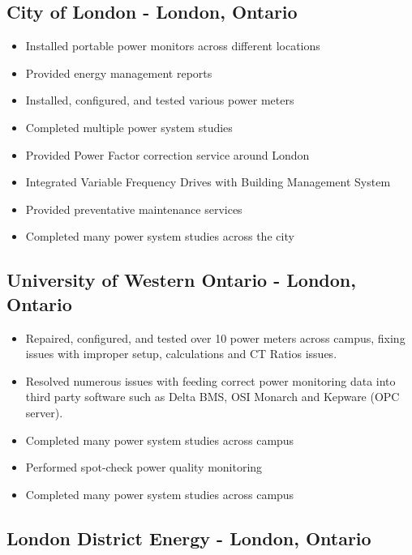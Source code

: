 \pagebreak

\subsection{City of London - London, Ontario}
\label{PreExp:CoL}

\begin{itemize}
	\item Installed portable power monitors across different locations
	\item Provided energy management reports
	\item Installed, configured, and tested various power meters
	\item Completed multiple power system studies
	\item Provided Power Factor correction service around London
	\item Integrated Variable Frequency Drives with Building Management System
	\item Provided preventative maintenance services
	\item Completed many power system studies across the city
\end{itemize}

\pagebreak

\subsection{University of Western Ontario - London, Ontario}
\label{PreExp:UWO}


\begin{itemize}
		\item Repaired, configured, and tested over 10 power meters across campus, fixing issues with improper setup, calculations and CT Ratios issues.
		\item Resolved numerous issues with feeding correct power monitoring data into third party software such as Delta BMS, OSI Monarch and Kepware (OPC server).
		\item Completed many power system studies across campus
		\item Performed spot-check power quality monitoring
		\item Completed many power system studies across campus
\end{itemize}

\pagebreak

\subsection{London District Energy - London, Ontario}
\label{PreExp:LDE}

